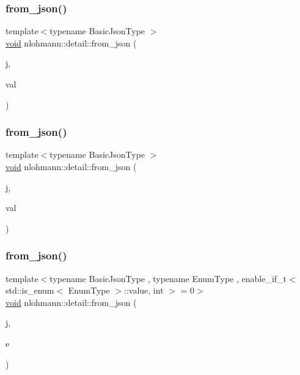 \subsubsection{\texorpdfstring{from\+\_\+json()}{from\_json()}\hspace{0.1cm}{\footnotesize\ttfamily [6/18]}}
{\footnotesize\ttfamily template$<$typename Basic\+Json\+Type $>$ \\
\hyperlink{namespacenlohmann_1_1detail_a59fca69799f6b9e366710cb9043aa77d}{void} nlohmann\+::detail\+::from\+\_\+json (\begin{DoxyParamCaption}\item[{const Basic\+Json\+Type \&}]{j,  }\item[{typename Basic\+Json\+Type\+::number\+\_\+unsigned\+\_\+t \&}]{val }\end{DoxyParamCaption})}

\mbox{\label{namespacenlohmann_1_1detail_a047d881e611fcac709dc318f730a1732}} 
\subsubsection{\texorpdfstring{from\+\_\+json()}{from\_json()}\hspace{0.1cm}{\footnotesize\ttfamily [7/18]}}
{\footnotesize\ttfamily template$<$typename Basic\+Json\+Type $>$ \\
\hyperlink{namespacenlohmann_1_1detail_a59fca69799f6b9e366710cb9043aa77d}{void} nlohmann\+::detail\+::from\+\_\+json (\begin{DoxyParamCaption}\item[{const Basic\+Json\+Type \&}]{j,  }\item[{typename Basic\+Json\+Type\+::number\+\_\+integer\+\_\+t \&}]{val }\end{DoxyParamCaption})}

\mbox{\label{namespacenlohmann_1_1detail_a5440d650150d01e8015133521351b459}} 
\subsubsection{\texorpdfstring{from\+\_\+json()}{from\_json()}\hspace{0.1cm}{\footnotesize\ttfamily [8/18]}}
{\footnotesize\ttfamily template$<$typename Basic\+Json\+Type , typename Enum\+Type , enable\+\_\+if\+\_\+t$<$ std\+::is\+\_\+enum$<$ Enum\+Type $>$\+::value, int $>$  = 0$>$ \\
\hyperlink{namespacenlohmann_1_1detail_a59fca69799f6b9e366710cb9043aa77d}{void} nlohmann\+::detail\+::from\+\_\+json (\begin{DoxyParamCaption}\item[{const Basic\+Json\+Type \&}]{j,  }\item[{Enum\+Type \&}]{e }\end{DoxyParamCaption})}

